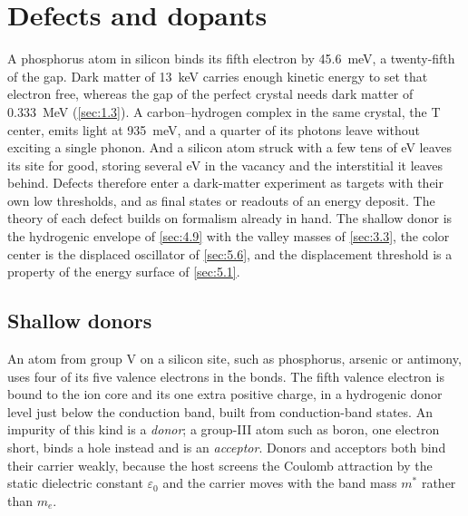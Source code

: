 \section{Defects and dopants}\label{sec:7.4}

A phosphorus atom in silicon binds its fifth electron by \SI{45.6}{meV}, a twenty-fifth of the gap. Dark matter of \SI{13}{keV} carries enough kinetic energy to set that electron free, whereas the gap of the perfect crystal needs dark matter of \SI{0.333}{MeV} (\cref{sec:1.3}). A carbon--hydrogen complex in the same crystal, the T center, emits light at \SI{935}{meV}, and a quarter of its photons leave without exciting a single phonon. And a silicon atom struck with a few tens of eV leaves its site for good, storing several eV in the vacancy and the interstitial it leaves behind. Defects therefore enter a dark-matter experiment as targets with their own low thresholds, and as final states or readouts of an energy deposit. The theory of each defect builds on formalism already in hand. The shallow donor is the hydrogenic envelope of \cref{sec:4.9} with the valley masses of \cref{sec:3.3}, the color center is the displaced oscillator of \cref{sec:5.6}, and the displacement threshold is a property of the energy surface of \cref{sec:5.1}.

\subsection{Shallow donors}

An atom from group V on a silicon site, such as phosphorus, arsenic or antimony, uses four of its five valence electrons in the bonds. The fifth valence electron is bound to the ion core and its one extra positive charge, in a hydrogenic donor level just below the conduction band, built from conduction-band states. An impurity of this kind is a \emph{donor}; a group-III atom such as boron, one electron short, binds a hole instead and is an \emph{acceptor}. Donors and acceptors both bind their carrier weakly, because the host screens the Coulomb attraction by the static dielectric constant $\varepsilon_0$ and the carrier moves with the band mass $m^*$ rather than $m_e$.

